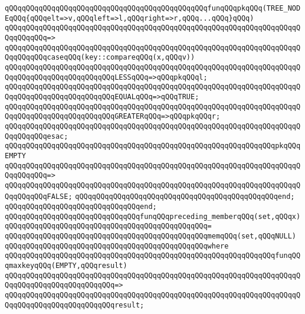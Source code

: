 \verb|qQQqqQQqqQQqqQQqqQQqqQQqqQQqqQQqqQQqqQQqqQQqqQQqfunqQQqpkqQQq(TREE_NODEqQQq{qQQqelt=>v,qQQqleft=>l,qQQqright=>r,qQQq...qQQq}qQQq)|\newline
\verb|qQQqqQQqqQQqqQQqqQQqqQQqqQQqqQQqqQQqqQQqqQQqqQQqqQQqqQQqqQQqqQQqqQQqqQQqqQQqqQQq=>|\newline
\verb|qQQqqQQqqQQqqQQqqQQqqQQqqQQqqQQqqQQqqQQqqQQqqQQqqQQqqQQqqQQqqQQqqQQqqQQqqQQqqQQqcaseqQQq(key::compareqQQq(x,qQQqv))|\newline
\verb|qQQqqQQqqQQqqQQqqQQqqQQqqQQqqQQqqQQqqQQqqQQqqQQqqQQqqQQqqQQqqQQqqQQqqQQqqQQqqQQqqQQqqQQqqQQqqQQqLESSqQQq=>qQQqpkqQQql;|\newline
\verb|qQQqqQQqqQQqqQQqqQQqqQQqqQQqqQQqqQQqqQQqqQQqqQQqqQQqqQQqqQQqqQQqqQQqqQQqqQQqqQQqqQQqqQQqqQQqqQQqEQUALqQQq=>qQQqTRUE;|\newline
\verb|qQQqqQQqqQQqqQQqqQQqqQQqqQQqqQQqqQQqqQQqqQQqqQQqqQQqqQQqqQQqqQQqqQQqqQQqqQQqqQQqqQQqqQQqqQQqqQQqGREATERqQQq=>qQQqpkqQQqr;|\newline
\verb|qQQqqQQqqQQqqQQqqQQqqQQqqQQqqQQqqQQqqQQqqQQqqQQqqQQqqQQqqQQqqQQqqQQqqQQqqQQqqQQqesac;|\newline
\newline
\verb|qQQqqQQqqQQqqQQqqQQqqQQqqQQqqQQqqQQqqQQqqQQqqQQqqQQqqQQqqQQqqQQqpkqQQqEMPTY|\newline
\verb|qQQqqQQqqQQqqQQqqQQqqQQqqQQqqQQqqQQqqQQqqQQqqQQqqQQqqQQqqQQqqQQqqQQqqQQqqQQqqQQq=>|\newline
\verb|qQQqqQQqqQQqqQQqqQQqqQQqqQQqqQQqqQQqqQQqqQQqqQQqqQQqqQQqqQQqqQQqqQQqqQQqqQQqqQQqFALSE;|\newline
\verb|qQQqqQQqqQQqqQQqqQQqqQQqqQQqqQQqqQQqqQQqqQQqqQQqend;|\newline
\verb|qQQqqQQqqQQqqQQqqQQqqQQqqQQqqQQqend;|\newline
\verb|qQQqqQQqqQQqqQQqqQQqqQQqqQQqqQQqfunqQQqpreceding_memberqQQq(set,qQQqx)|\newline
\verb|qQQqqQQqqQQqqQQqqQQqqQQqqQQqqQQqqQQqqQQqqQQqqQQq=|\newline
\verb|qQQqqQQqqQQqqQQqqQQqqQQqqQQqqQQqqQQqqQQqqQQqqQQqmemqQQq(set,qQQqNULL)|\newline
\verb|qQQqqQQqqQQqqQQqqQQqqQQqqQQqqQQqqQQqqQQqqQQqqQQqwhere|\newline
\verb|qQQqqQQqqQQqqQQqqQQqqQQqqQQqqQQqqQQqqQQqqQQqqQQqqQQqqQQqqQQqqQQqfunqQQqmaxkeyqQQq(EMPTY,qQQqresult)|\newline
\verb|qQQqqQQqqQQqqQQqqQQqqQQqqQQqqQQqqQQqqQQqqQQqqQQqqQQqqQQqqQQqqQQqqQQqqQQqqQQqqQQqqQQqqQQqqQQqqQQq=>|\newline
\verb|qQQqqQQqqQQqqQQqqQQqqQQqqQQqqQQqqQQqqQQqqQQqqQQqqQQqqQQqqQQqqQQqqQQqqQQqqQQqqQQqqQQqqQQqqQQqqQQqresult;|\newline

